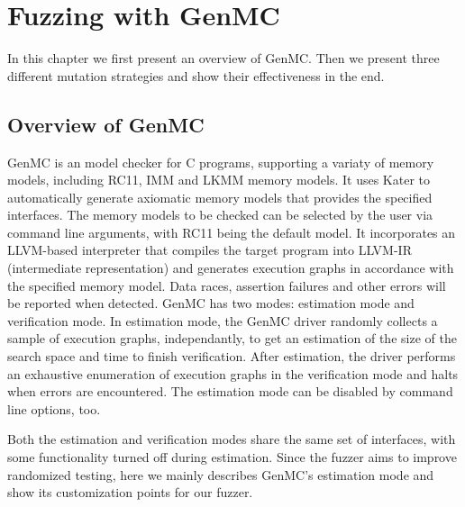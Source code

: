 \chapter{\label{cha:genmc}Fuzzing with GenMC}


In this chapter we first present an overview of GenMC. Then we present three different mutation strategies and show their effectiveness in the end.

\section{Overview of GenMC}

GenMC is an model checker for C programs, supporting a variaty of memory models, including RC11\cite{RC11}, IMM\cite{IMM} and LKMM\cite{LKMM} memory models. It uses Kater\cite{Kater} to automatically generate axiomatic memory models that provides the specified interfaces. The memory models to be checked can be selected by the user via command line arguments, with RC11 being the default model. It incorporates an LLVM-based interpreter that compiles the target program into LLVM-IR (intermediate representation) and generates execution graphs in accordance with the specified memory model. Data races, assertion failures and other errors will be reported when detected. GenMC has two modes: estimation mode and verification mode. In estimation mode, the GenMC driver randomly collects a sample of execution graphs, independantly, to get an estimation of the size of the search space and time to finish verification. After estimation, the driver performs an exhaustive enumeration of execution graphs in the verification mode and halts when errors are encountered. The estimation mode can be disabled by command line options, too.

Both the estimation and verification modes share the same set of interfaces, with some functionality turned off during estimation. Since the fuzzer aims to improve randomized testing, here we mainly describes GenMC's estimation mode and show its customization points for our fuzzer.

